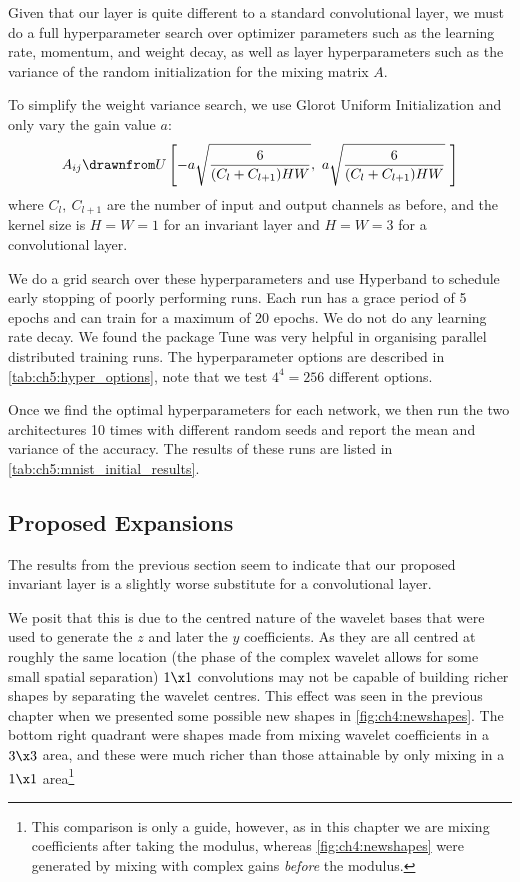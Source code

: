 Given that our layer is quite different to a standard convolutional layer, we
must do a full hyperparameter search over optimizer parameters such as the
learning rate, momentum, and weight decay, as well as layer hyperparameters 
such as the variance of the random initialization for the mixing matrix $A$.

To simplify the weight variance search, we use Glorot Uniform Initialization
\cite{glorot_understanding_2010} and only vary the gain value $a$:
%
\begin{equation}
  A_{ij} \drawnfrom U\left[ -a\sqrt{\frac{6}{(C_l + C_{l+1})HW}},\ a\sqrt{\frac{6}{(C_l + C_{l+1})HW}}\
  \right] \label{eq:ch5:glorot}
\end{equation}
%
where $C_l,\ C_{l+1}$ are the number of input and output channels as before, and
the kernel size is $H = W = 1$ for an invariant layer and $H = W= 3$ for a
convolutional layer.

We do a grid search over these hyperparameters and use Hyperband
\cite{li_hyperband:_2016} to schedule early stopping of poorly performing runs.
Each run has a grace period of 5 epochs and can train for a maximum of 20
epochs. We do not do any learning rate decay.  We found the package Tune
\cite{liaw2018tune} was very helpful in organising parallel distributed training
runs.  
The hyperparameter options are described in
\autoref{tab:ch5:hyper_options}, note that we test $4^4=256$ different options.

Once we find the optimal hyperparameters for each network, we then run the two
architectures 10 times with different random seeds and report the mean and variance of
the accuracy. The results of these runs are listed in
\autoref{tab:ch5:mnist_initial_results}.


\subsection{Proposed Expansions}\label{sec:ch5:mnist_newlayer}
The results from the previous section seem to indicate that our proposed
invariant layer is a slightly worse substitute for a convolutional layer.

We posit that this is due to the centred nature of the wavelet bases that were
used to generate the $z$ and later the $y$ coefficients. As they are all centred
at roughly the same location (the phase of the complex wavelet allows for some
small spatial separation) $1\x 1$ convolutions may not be capable of building
richer shapes by separating the wavelet centres. This effect was seen in the
previous chapter when we presented some possible new shapes in
\autoref{fig:ch4:newshapes}. The bottom right quadrant were shapes made from
mixing wavelet coefficients in a $3\x 3$ area, and these were much richer than
those attainable by only mixing in a $1\x 1$ area\footnote{This comparison is
only a guide, however, as in this chapter we are mixing coefficients after taking
the modulus, whereas \autoref{fig:ch4:newshapes} were generated by mixing with
complex gains \emph{before} the modulus.}

